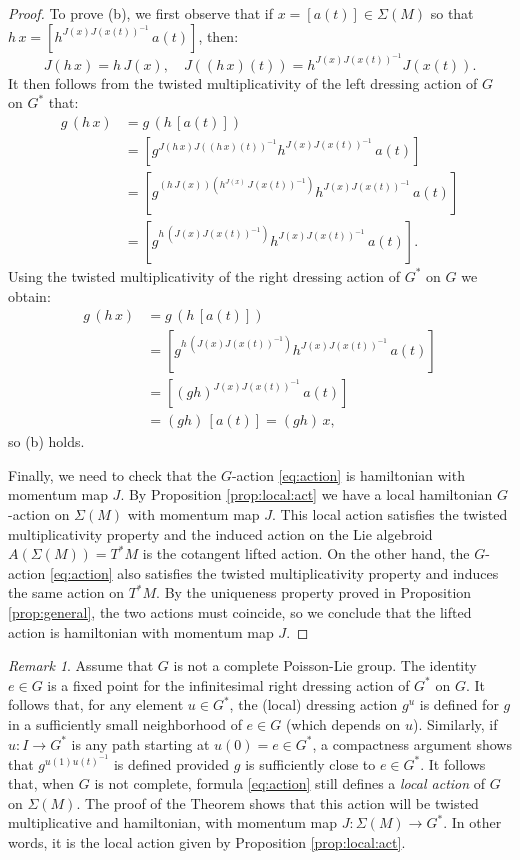 \documentclass[a4paper,11pt]{amsart}
\theoremstyle{definition}
\theoremstyle{remark}
\newtheorem{rem}[thm]{Remark}
\begin{document}
\begin{proof}
To prove (b), we first observe that if $x=[a(t)]\in\Sigma(M)$ so
that $h\, x=[h^{J(x)J(x(t))^{-1}}\, a(t)]$, then:
\[ J(h\, x)=h\, J(x),\quad J((h\, x)(t))=h^{J(x)J(x(t))^{-1}}J(x(t)).\]
It then follows from the twisted multiplicativity of the left dressing action of $G$ on $G^*$ that:
\begin{align*}
g\, (h\, x)&=g\,(h\, [a(t)])\\
&=[g^{J(h\, x)J((h\, x)(t))^{-1}}h^{J(x)J(x(t))^{-1}}\, a(t)]\\
&=[g^{(h\, J(x))(h^{J(x)}\, J(x(t))^{-1})}h^{J(x)J(x(t))^{-1}}\, a(t)]\\
&=[g^{h\, (J(x) J(x(t))^{-1})}h^{J(x)J(x(t))^{-1}}\, a(t)].
\end{align*}
Using the twisted multiplicativity of the right dressing action of $G^*$ on $G$ we obtain:
\begin{align*}
g\,(h\, x)&=g\,(h\, [a(t)])\\
&=[g^{h\, (J(x) J(x(t))^{-1})}h^{J(x)J(x(t))^{-1}}\, a(t)]\\
&=[(gh)^{J(x)J(x(t))^{-1}}\, a(t)]\\
&=(gh)\,[a(t)]=(gh)\, x,
\end{align*}
so (b) holds.

Finally, we need to check that the $G$-action \eqref{eq:action} is hamiltonian with momentum map $J$. By
Proposition \ref{prop:local:act} we have a local hamiltonian $G$-action on $\Sigma(M)$ with momentum map $J$.
This local action satisfies the twisted multiplicativity property and the induced action on the Lie algebroid
$A(\Sigma(M))=T^*M$ is the cotangent lifted action. On the other hand, the $G$-action \eqref{eq:action} also
satisfies the twisted multiplicativity property and induces the same action on $T^*M$. By the uniqueness
property proved in Proposition \ref{prop:general}, the two actions must coincide, so we conclude that the lifted
action is hamiltonian with momentum map $J$.
\end{proof}

\begin{rem}
\label{rem:local:action} Assume that $G$ is not a complete Poisson-Lie group. The identity $e\in G$ is a fixed
point for the infinitesimal right dressing action of $G^*$ on $G$. It follows that, for any element $u\in G^*$,
the (local) dressing action $g^u$ is defined for $g$ in a sufficiently small neighborhood of $e\in G$ (which
depends on $u$). Similarly, if $u:I\to G^*$ is any path starting at $u(0)=e\in G^*$, a compactness argument
shows that $g^{u(1) u(t)^{-1}}$ is defined provided $g$ is sufficiently close to $e\in G^*$. It follows that,
when $G$ is not complete, formula \eqref{eq:action} still defines a \emph{local action} of $G$ on $\Sigma(M)$.
The proof of the Theorem shows that this action will be twisted multiplicative and hamiltonian, with momentum
map $J:\Sigma(M)\to G^*$. In other words, it is the local action given by Proposition \ref{prop:local:act}.
\end{rem}
\end{document}
